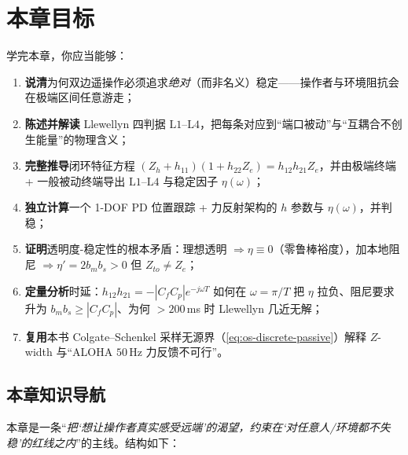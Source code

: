 \section*{本章目标}
学完本章，你应当能够：
\begin{enumerate}
  \item \textbf{说清}为何双边遥操作必须追求\emph{绝对}（而非名义）稳定——操作者与环境阻抗会在极端区间任意游走；
  \item \textbf{陈述并解读} Llewellyn 四判据 $\mathrm{L1}$--$\mathrm{L4}$，把每条对应到“端口被动”与“互耦合不创生能量”的物理含义；
  \item \textbf{完整推导}闭环特征方程 $(Z_h+h_{11})(1+h_{22}Z_e)=h_{12}h_{21}Z_e$，并由极端终端 + 一般被动终端导出 $\mathrm{L1}$--$\mathrm{L4}$ 与稳定因子 $\eta(\omega)$；
  \item \textbf{独立计算}一个 1-DOF PD 位置跟踪 + 力反射架构的 $h$ 参数与 $\eta(\omega)$，并判稳；
  \item \textbf{证明}透明度-稳定性的根本矛盾：理想透明 $\Rightarrow\eta\equiv0$（零鲁棒裕度），加本地阻尼 $\Rightarrow\eta'=2b_mb_s>0$ 但 $Z_{to}\neq Z_e$；
  \item \textbf{定量分析}时延：$h_{12}h_{21}=-|C_fC_p|e^{-j\omega T}$ 如何在 $\omega=\pi/T$ 把 $\eta$ 拉负、阻尼要求升为 $b_mb_s\ge|C_fC_p|$、为何 $>200\,$ms 时 Llewellyn 几近无解；
  \item \textbf{复用}本书 Colgate--Schenkel 采样无源界（\cref{eq:os-discrete-passive}）解释 $Z$-width 与“ALOHA $50\,$Hz 力反馈不可行”。
\end{enumerate}

\subsection*{本章知识导航}
本章是一条“\emph{把‘想让操作者真实感受远端’的渴望，约束在‘对任意人/环境都不失稳’的红线之内}”的主线。结构如下：


